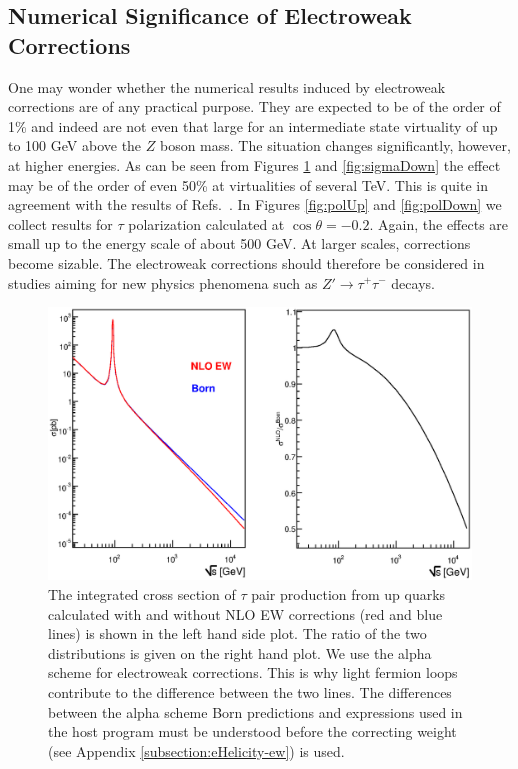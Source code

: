 \documentclass[]{Tauola_interface_design}
\begin{document}
\subsection {Numerical Significance of Electroweak Corrections }
One may wonder whether the numerical results induced by electroweak corrections are
of any practical purpose. They are expected to be of the order of
1\%  and indeed are not even that large  for 
an intermediate state virtuality of up to 100 GeV above the $Z$ boson mass.
The situation changes significantly, however, at higher energies. As can be 
seen from  Figures \ref{fig:sigmaUp} and  \ref{fig:sigmaDown} the effect may 
be of the order of even 50\% at virtualities of several TeV. 
This is quite in agreement with the results of Refs.~\cite{Adam:2008ge,Adam:2008pc}. In  Figures 
\ref{fig:polUp} and  \ref{fig:polDown} we collect results for 
$\tau$ polarization calculated at $\cos \theta=-0.2$. Again,
 the effects are small up to the energy scale of about 500 GeV. At larger scales,
 corrections  become sizable. The electroweak corrections
should therefore be considered in studies aiming for new physics phenomena
such as $Z'\to \tau^+\tau^-$ decays.

\begin{figure}[h!]
\centering
\includegraphics[scale=0.76]{figures/2u2tau_sigma.eps}
\caption{\label{fig:sigmaUp} 
 The integrated cross section of $\tau$ pair production from up quarks  
calculated with and without NLO
EW corrections (red and blue lines) is shown in the left hand side plot. 
The ratio of the two distributions 
is given on the right hand plot.   
We use the alpha scheme for electroweak corrections. This is why 
light fermion loops contribute to the difference between the two lines.
 The differences between the alpha scheme Born predictions  and expressions
used in the host program
must be understood before the correcting weight (see Appendix \ref{subsection:eHelicity-ew}) is used.
 }
\end{figure}
\end{document}
